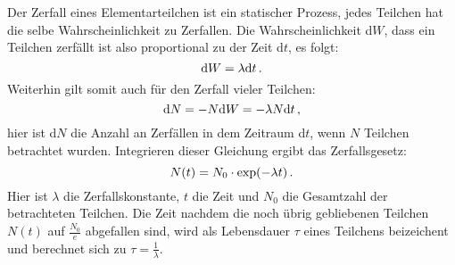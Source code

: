        Der Zerfall eines Elementarteilchen ist ein statischer Prozess, jedes Teilchen hat die selbe Wahrscheinlichkeit zu Zerfallen.
        Die Wahrscheinlichkeit d$W$, dass ein Teilchen zerfällt ist also proportional zu der Zeit d$t$, es folgt:
        \begin{equation}
            \text{d}W = \lambda\text{d}t \, .
        \end{equation}
        Weiterhin gilt somit auch für den Zerfall vieler Teilchen:
        \begin{equation}
            \text{d}N = -N\text{d}W = -\lambda N \text{d}t \, ,
        \end{equation}
       hier ist d$N$ die Anzahl an Zerfällen in dem Zeitraum d$t$, wenn $N$ Teilchen betrachtet wurden.
       Integrieren dieser Gleichung ergibt das Zerfallsgesetz:
       \begin{equation}
           N(t) = N_0 \cdot \text{exp}(-\lambda t)\, .
       \end{equation}
       Hier ist $\lambda$ die Zerfallskonstante, $t$ die Zeit und $N_0$ die Gesamtzahl der betrachteten Teilchen. 
       Die Zeit nachdem die noch übrig gebliebenen Teilchen $N(t)$ auf $\frac{N_0}{e}$ abgefallen sind, wird als Lebensdauer $\tau$ eines Teilchens beizeichent und berechnet sich zu $\tau = \frac{1}{\lambda}$.





